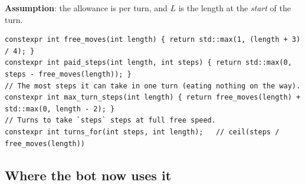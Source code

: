 \documentclass[11pt,a4paper]{article}
\begin{document}
\textbf{Assumption}: the allowance is per turn, and $L$ is the length at the \emph{start} of the turn.

\begin{lstlisting}
constexpr int free_moves(int length) { return std::max(1, (length + 3) / 4); }
constexpr int paid_steps(int length, int steps) { return std::max(0, steps - free_moves(length)); }
// The most steps it can take in one turn (eating nothing on the way).
constexpr int max_turn_steps(int length) { return free_moves(length) + std::max(0, length - 2); }
// Turns to take `steps` steps at full free speed.
constexpr int turns_for(int steps, int length);   // ceil(steps / free_moves(length))
\end{lstlisting}

\subsection{Where the bot now uses it}
\end{document}
